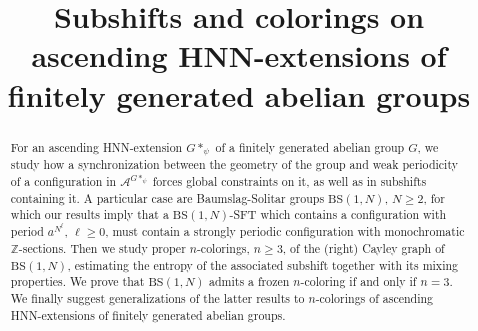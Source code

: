 \documentclass[cupthm,crop,info]{CUP-JNL-ETS}%
\theoremstyle{cupplain}
\theoremstyle{cupdefinition}
\theoremstyle{cupremark}
\theoremstyle{cupproof}
\numberwithin{equation}{section}
\newcommand{\BS}[1][N]{\mathrm{BS}(1,#1)}
\begin{document}
\begin{Frontmatter}

\title{Subshifts and colorings on ascending HNN-extensions of finitely generated abelian groups}

\author{ }

\address{\\ ()}


\maketitle


\begin{abstract}
For an ascending HNN-extension $G*_{\psi}$ of a finitely generated abelian group $G$, we study how a synchronization between the geometry of the group and weak periodicity of a configuration in $\mathcal{A}^{G*_{\psi}}$ forces global constraints on it, as well as in subshifts containing it. A particular case are Baumslag-Solitar groups $\BS$, $N\ge2$, for which our results imply that a $\BS$-SFT which contains a configuration with period $a^{N^\ell}$, $\ell\ge 0$, must contain a strongly periodic configuration with monochromatic $\mathbb{Z}$-sections. Then we study proper $n$-colorings, $n\ge 3$, of the (right) Cayley graph of $\BS$, estimating the entropy of the associated subshift together with its mixing properties. We prove that $\BS$ admits a frozen $n$-coloring if and only if $n=3$. We finally suggest generalizations of the latter results to $n$-colorings of ascending HNN-extensions of finitely generated abelian groups.
\end{abstract}




\end{Frontmatter}
\end{document}
